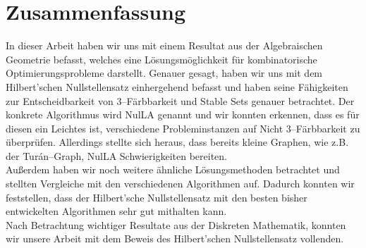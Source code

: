 \part*{Zusammenfassung}

In dieser Arbeit haben wir uns mit einem Resultat aus der Algebraischen Geometrie befasst, welches eine Lösungsmöglichkeit für kombinatorische Optimierungsprobleme darstellt. Genauer gesagt, haben wir uns mit dem Hilbert'schen Nullstellensatz einhergehend befasst und haben seine Fähigkeiten zur Entscheidbarkeit von 3--Färbbarkeit und Stable Sets genauer betrachtet. Der konkrete Algorithmus wird NulLA genannt und wir konnten erkennen, dass es für diesen ein Leichtes ist, verschiedene Probleminstanzen auf Nicht 3--Färbbarkeit zu überprüfen. Allerdings stellte sich heraus, dass bereits kleine Graphen, wie z.B. der Turán--Graph, NulLA Schwierigkeiten bereiten. \\
Außerdem haben wir noch weitere ähnliche Lösungsmethoden betrachtet und stellten Vergleiche mit den verschiedenen Algorithmen auf. Dadurch konnten wir feststellen, dass der Hilbert'sche Nullstellensatz mit den besten bisher entwickelten Algorithmen sehr gut mithalten kann. \\
Nach Betrachtung wichtiger Resultate aus der Diskreten Mathematik, konnten wir unsere Arbeit mit dem Beweis des Hilbert'schen Nullstellensatz vollenden.


